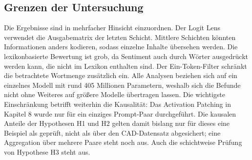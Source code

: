 \subsection{Grenzen der Untersuchung}

Die Ergebnisse sind in mehrfacher Hinsicht einzuordnen. Der Logit Lens verwendet die Ausgabematrix der letzten Schicht. Mittlere Schichten könnten Informationen anders kodieren, sodass einzelne Inhalte übersehen werden. Die lexikonbasierte Bewertung ist grob, da Sentiment auch durch Wörter ausgedrückt werden kann, die nicht im Lexikon enthalten sind. Der Ein-Token-Filter schränkt die betrachtete Wortmenge zusätzlich ein. Alle Analysen beziehen sich auf ein einzelnes Modell mit rund 405 Millionen Parametern, weshalb sich die Befunde nicht ohne Weiteres auf größere Modelle übertragen lassen. Die wichtigste Einschränkung betrifft weiterhin die Kausalität: Das Activation Patching in Kapitel 8 wurde nur für ein einziges Prompt-Paar durchgeführt. Die kausalen Anteile der Hypothesen H1 und H2 gelten damit bislang nur für dieses eine Beispiel als geprüft, nicht als über den CAD-Datensatz abgesichert; eine Aggregation über mehrere Paare steht noch aus. Auch die schichtweise Prüfung von Hypothese H3 steht aus.
